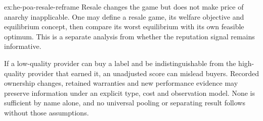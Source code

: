 \documentclass[11pt,a4paper]{article}
\theoremstyle{definition}
\theoremstyle{definition}
\theoremstyle{remark}
\begin{document}
\begin{pdsolution}{ex:he-poa-resale-reframe}
Resale changes the game but does not make price of anarchy inapplicable.
One may define a resale game, its welfare objective and equilibrium concept,
then compare its worst equilibrium with its own feasible optimum. This is a
separate analysis from whether the reputation signal remains informative.

If a low-quality provider can buy a label and be indistinguishable from the
high-quality provider that earned it, an unadjusted score can mislead buyers.
Recorded ownership changes, retained warranties and new performance evidence
may preserve information under an explicit type, cost and observation model.
None is sufficient by name alone, and no universal pooling or separating
result follows without those assumptions.
\end{pdsolution}

\end{document}
